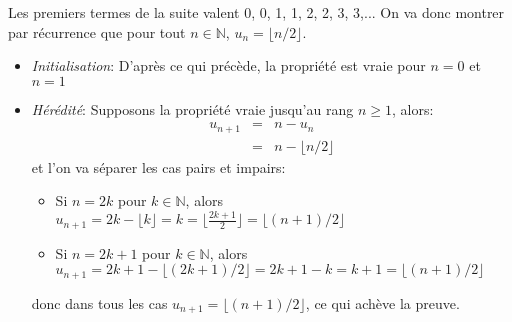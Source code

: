 Les premiers termes de la suite valent 0, 0, 1, 1, 2, 2, 3, 3,... On va donc montrer par récurrence que pour tout $n\in\mathbb{N}$, $u_n=\lfloor n/2 \rfloor$.
\begin{itemize}
  \item \textit{Initialisation}: D’après ce qui précède, la propriété est vraie pour $n=0$ et $n=1$
  \item \textit{Hérédité}: Supposons la propriété vraie jusqu'au rang $n\geq 1$, alors:
  \begin{eqnarray*}
    u_{n+1} &=& n - u_{n}\\
    &=& n - \lfloor n/2 \rfloor 
  \end{eqnarray*}
  et l'on va séparer les cas pairs et impairs:
  \begin{itemize}
    \item Si $n=2k$ pour $k\in\mathbb{N}$, alors $u_{n+1}=2k-\lfloor k \rfloor = k = \lfloor \frac{2k+1}{2} \rfloor = \lfloor (n+1)/2 \rfloor$
    \item Si $n=2k+1$ pour $k\in\mathbb{N}$, alors $u_{n+1}=2k+1-\lfloor (2k+1)/2 \rfloor = 2k+1-k = k+1 = \lfloor (n+1)/2 \rfloor$
  \end{itemize}
  donc dans tous les cas $u_{n+1}=\lfloor (n+1)/2 \rfloor$, ce qui achève la preuve.
\end{itemize}
